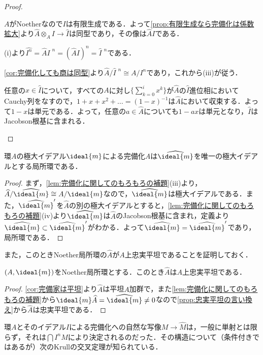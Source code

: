 \begin{proof}
	\begin{sakura}
		\item $A$がNoetherなので$I$は有限生成である．よって\ref{prop:有限生成なら完備化は係数拡大}より$\widehat{A}\otimes_A I\to\widehat{I}$は同型であり，その像は$\widehat{A}I$である．
		
		\item (i)より$\widehat{I^n}=\widehat{A}I{\phantom{|}}^n=(\widehat{A}I)^n=\widehat{I}{\phantom{|}}^n$である．
		
		\item \ref{cor:完備化しても商は同型}より$\widehat{A}/\widehat{I}{\phantom{|}}^n\cong A/I^n$であり，これから(iii)が従う．
		
		\item 任意の$x\in\widehat{I}$について，すべての$A$に対し$\{\sum_{k=0}^i x^k\}$が$\widehat{A}$の$\widehat{I}$進位相においてCauchy列をなすので，$1+x+x^2+\dots=(1-x)^{-1}$は$\widehat{A}$において収束する．よって$1-x$は単元である．よって，任意の$a\in\widehat{A}$についても$1-ax$は単元となり，$\widehat{I}$はJacobson根基に含まれる．
	\end{sakura}
\end{proof}

\begin{prop}
	環$A$の極大イデアル$\ideal{m}$による完備化$\widehat{A}$は$\widehat{\ideal{m}}$を唯一の極大イデアルとする局所環である．
\end{prop}

\begin{proof}
	まず，\ref{lem:完備化に関してのもろもろの補題}(iii)より，$\widehat{A}/\widehat{\ideal{m}}\cong A/\ideal{m}$なので，$\widehat{\ideal{m}}$は極大イデアルである．また，$\widehat{\ideal{m}}'$を$\widehat{A}$の別の極大イデアルとすると，\ref{lem:完備化に関してのもろもろの補題}(iv)より$\widehat{\ideal{m}}$は$\widehat{A}$のJacobson根基に含まれ，定義より$\widehat{\ideal{m}}\subset\widehat{\ideal{m}}'$がわかる．よって$\widehat{\ideal{m}}=\widehat{\ideal{m}}'$であり，局所環である．
\end{proof}

また，このときNoether局所環の$\widehat{A}$が$A$上忠実平坦であることを証明しておく．

\begin{prop}\label{prop:完備化は忠実平坦}
	$(A,\ideal{m})$をNoether局所環とする．このとき$\widehat{A}$は$A$上忠実平坦である．
\end{prop}

\begin{proof}
	\ref{cor:完備家は平坦}より$\widehat{A}$は平坦$A$加群で，また\ref{lem:完備化に関してのもろもろの補題}から$\ideal{m}\widehat{A}=\widehat{\ideal{m}}\neq 0$なので\ref{prop:忠実平坦の言い換え}から$\widehat{A}$は忠実平坦である．
\end{proof}
環$A$とそのイデアル$I$による完備化への自然な写像$M\to\widehat{M}$は，一般に単射とは限らず，それは$\bigcap I^nM$により決定されるのだった．その構造について（条件付きではあるが）次のKrullの交叉定理が知られている．

